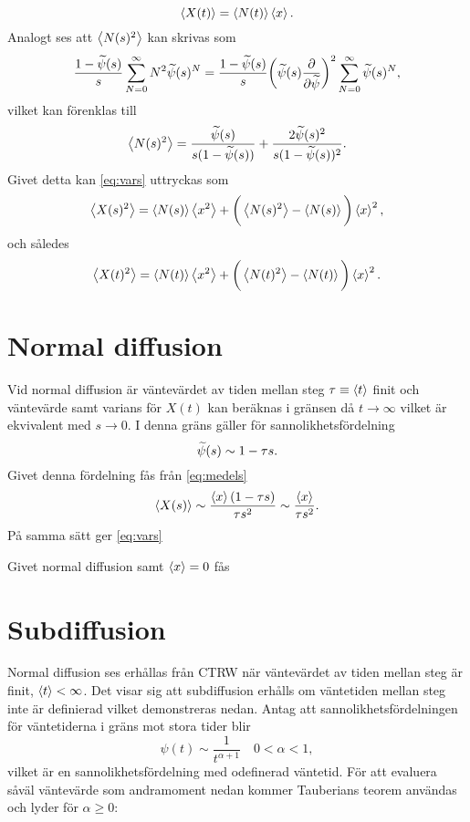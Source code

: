 \begin{equation}\label{eq:medelt}
   \ev{X(t)} = \ev{N(t)}\ev{x}.
\end{equation}
Analogt ses att $\ev{N(s)^2}$ kan skrivas som
\begin{equation}
   \frac{1-\widetilde{\psi} (s)}{s}\sum_{N=0}^{\infty}N^2\widetilde{\psi} (s)^N = \frac{1-\widetilde{\psi} (s)}{s}\bigg (\widetilde{\psi} (s)\frac{\partial}{\partial \widetilde{\psi}} \bigg )^2\sum_{N=0}^{\infty}\widetilde{\psi} (s)^N,
\end{equation}
vilket kan förenklas till 
\begin{equation}
   \ev{N(s)^2} = \frac{\psis (s)}{s(1-\psis (s))}+\frac{2\psis (s)^2}{s(1-\psis (s))^2}.
\end{equation}
Givet detta kan \eqref{eq:vars} uttryckas som 
\begin{equation}
   \ev{X(s)^2} = \ev{N(s)}\ev{x^2}+\bigg (\ev{N(s)^2}-\ev{N(s)}\bigg )\ev{x}^2,
\end{equation}
och således
\begin{equation}\label{eq:vart}
      \ev{X(t)^2} = \ev{N(t)}\ev{x^2}+\bigg (\ev{N(t)^2}-\ev{N(t)}\bigg )\ev{x}^2.
\end{equation}






\section{Normal diffusion}
Vid normal diffusion är väntevärdet av tiden mellan steg $\tau\equiv\ev{t}$ finit och väntevärde samt varians för $X(t)$ kan beräknas i gränsen då $t\to\infty$ vilket är ekvivalent med $s\to0$. I denna gräns gäller för sannolikhetsfördelning 
\begin{equation}
\widetilde{\psi} (s) \sim 1-\tau s.
\end{equation}
Givet denna fördelning fås från \eqref{eq:medels}
\begin{equation}
   \ev{X(s)}\sim \frac{\ev{x}(1-\tau s)}{\tau s^2}\sim\frac{\ev{x}}{\tau s^2}.
\end{equation}
På samma sätt ger \eqref{eq:vars}

Givet normal diffusion samt $\ev{x}=0$ fås 

\section{Subdiffusion}

Normal diffusion ses erhållas från CTRW när väntevärdet av tiden mellan steg är finit, $\ev{t}<\infty$. Det visar sig att subdiffusion erhålls om väntetiden mellan steg inte är definierad vilket demonstreras nedan. Antag att sannolikhetsfördelningen för väntetiderna i gräns mot stora tider blir 
\begin{equation}
\psi(t) \sim \frac{1}{t^{\alpha+1}}\quad 0<\alpha<1,
\end{equation}
vilket är en sannolikhetsfördelning med odefinerad väntetid. För att evaluera såväl väntevärde som andramoment nedan kommer Tauberians teorem\cite{Feller_prob1971} användas och lyder för $\alpha\geq0$:

